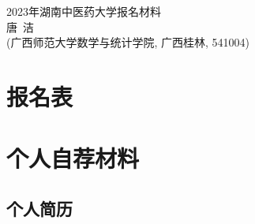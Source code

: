 \documentclass[UFT8]{ctexart}%
\begin{document}
\thispagestyle{empty} %
\vspace*{3cm}
\begin{center}
{{\LARGE\heiti 2023年湖南中医药大学报名材料}\\[0.6cm]
{\normalsize 唐\ 洁}\\[0.1cm]
{\small(广西师范大学数学与统计学院, 广西桂林, 541004)}}
\end{center}

\clearpage%
\tableofcontents%
\thispagestyle{empty} %

\clearpage%
\setcounter{page}{1}%

\section{报名表}


\section{个人自荐材料}
\subsection{个人简历}

\end{document}

